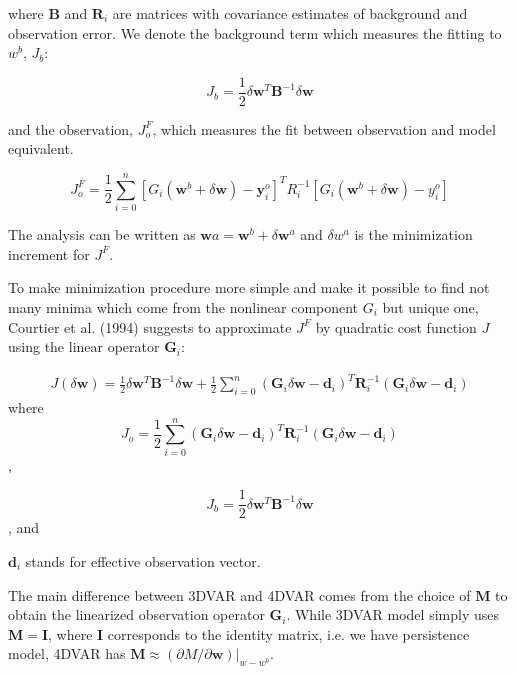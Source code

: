 \documentclass[a4,12pt]{article}
\numberwithin{equation}{section}
\begin{document}
where $\mathbf {B}$ and $\mathbf {R}_{i}$ are matrices with covariance estimates of background and observation error. We denote the background term which measures the fitting to $w^{b}$, $J_{b}$:

$$J_{b}=\frac{1}{2} \delta \mathbf {w}^{T} \mathbf {B}^{-1} \delta \mathbf {w}$$ 

and  the observation, $J_{o}^{F}$, which measures the fit between observation and model equivalent. 

$$J_{o}^{F}=\frac{1}{2} \sum_{i=0}^{n}[G_{i}(\mathbf {w}^{b}+\delta \mathbf {w})-\mathbf {y}_{i}^{o}]^{T}R_{i}^{-1}[G_{i}(\mathbf {w}^{b} + \delta \mathbf {w}) - y_{i}^{o}]$$

The analysis can be written as $\mathbf {w}{a} = \mathbf {w}^{b}+\delta \mathbf {w}^{a}$ and $\delta w^{a}$ is the minimization increment for $J^{F}$.

To make minimization procedure more simple and make it possible to find not many minima which come from the nonlinear component $G_{i}$ but unique one, Courtier et al. (1994) suggests to approximate $J^{F}$ by quadratic cost function $J$ using the linear operator $\mathbf {G}_{i}$:

\begin{align}
J(\delta \mathbf {w}) = \frac{1}{2} \delta \mathbf {w}^{T} \mathbf {B}^{-1} \delta \mathbf {w} + \frac{1}{2} \sum_{i=0}^{n}(\mathbf {G}_{i} \delta \mathbf {w} - \mathbf {d}_{i})^{T}\mathbf {R}_{i}^{-1}(\mathbf {G}_{i} \delta \mathbf {w} - \mathbf {d}_{i})
\end{align}
where $$J_{o} = \frac{1}{2} \sum_{i=0}^{n}(\mathbf {G}_{i} \delta \mathbf {w} - \mathbf {d}_{i})^{T}\mathbf {R}_{i}^{-1}(\mathbf {G}_{i} \delta \mathbf {w} - \mathbf {d}_{i})$$,

$$J_{b} = \frac{1}{2} \delta \mathbf {w}^{T} \mathbf {B}^{-1} \delta \mathbf {w}$$, and 

$\mathbf {d}_{i}$ stands for effective observation vector.

The main difference between 3DVAR and 4DVAR comes from the choice of $\mathbf{M}$ to obtain the linearized observation operator $\mathbf {G}_{i}$. While 3DVAR model simply uses $\mathbf {M} = \mathbf {I}$, where $\mathbf {I}$ corresponds to the identity matrix, i.e. we have persistence model, 4DVAR has $\mathbf {M} \approx (\partial M/\partial \mathbf {w})|_{w-w^{b}}$.
\end{document}
